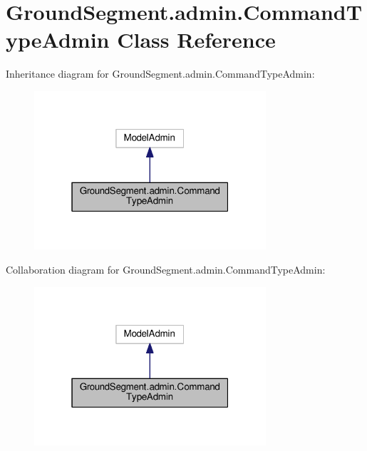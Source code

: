 \hypertarget{class_ground_segment_1_1admin_1_1_command_type_admin}{}\section{Ground\+Segment.\+admin.\+Command\+Type\+Admin Class Reference}
\label{class_ground_segment_1_1admin_1_1_command_type_admin}


Inheritance diagram for Ground\+Segment.\+admin.\+Command\+Type\+Admin\+:\nopagebreak
\begin{figure}[H]
\begin{center}
\leavevmode
\includegraphics[width=244pt]{class_ground_segment_1_1admin_1_1_command_type_admin__inherit__graph}
\end{center}
\end{figure}


Collaboration diagram for Ground\+Segment.\+admin.\+Command\+Type\+Admin\+:\nopagebreak
\begin{figure}[H]
\begin{center}
\leavevmode
\includegraphics[width=244pt]{class_ground_segment_1_1admin_1_1_command_type_admin__coll__graph}
\end{center}
\end{figure}
